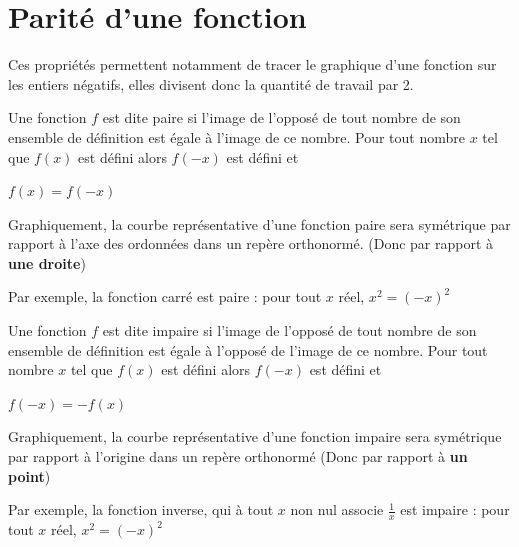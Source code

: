 \documentclass[10pt,a4paper]{book}
\begin{document}
\section{Parité d'une fonction}

Ces propriétés permettent notamment de tracer le graphique d'une fonction sur les entiers négatifs, elles divisent donc la quantité de travail par 2.

\begin{de}
    Une fonction $f$ est dite paire si l'image de l'opposé de tout nombre de son ensemble de définition est égale à l'image de ce nombre. Pour tout nombre $x$ tel que $f(x)$ est défini  alors $f(-x)$ est défini et 
    \vspace{0.3cm}
    \begin{center}
    \newline $f(x)=f(-x)$
    \end{center}
\end{de}

Graphiquement, la courbe représentative d'une fonction paire sera symétrique par rapport à l'axe des ordonnées dans un repère orthonormé. (Donc par rapport à  \textbf{une droite})

Par exemple, la fonction carré est paire : pour tout $x$ réel, $x^2=(-x)^2$


\begin{de}
    Une fonction $f$ est dite impaire si l'image de l'opposé de tout nombre de son ensemble de définition est égale à l'opposé de l'image de ce nombre. Pour tout nombre $x$ tel que $f(x)$ est défini  alors $f(-x)$ est défini et 
    \vspace{0.3cm}
    \begin{center}
    \newline $f(-x)=-f(x)$
    \end{center}
\end{de}

Graphiquement, la courbe représentative d'une fonction impaire sera symétrique par rapport à l'origine dans un repère orthonormé (Donc par rapport à  \textbf{un point})

Par exemple, la fonction inverse, qui à tout $x$ non nul associe $\frac{1}{x}$  est impaire : pour tout $x$ réel, $x^2=(-x)^2$
\begin{center}
\end{center}
\end{document}
